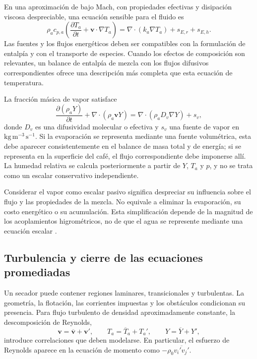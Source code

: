 En una aproximación de bajo Mach, con propiedades efectivas y disipación viscosa despreciable, una ecuación sensible para el fluido es
\begin{equation}
\rho_ac_{p,a}\left(
\frac{\partial T_a}{\partial t}+\mathbf v\cdot\nabla T_a\right)
=\nabla\cdot(k_a\nabla T_a)+s_{E,r}+s_{E,h}.
\label{eq:energia}
\end{equation}
Las fuentes y los flujos energéticos deben ser compatibles con la formulación de entalpía y con el transporte de especies. Cuando los efectos de composición son relevantes, un balance de entalpía de mezcla con los flujos difusivos correspondientes ofrece una descripción más completa que esta ecuación de temperatura.

La fracción másica de vapor satisface
\begin{equation}
\frac{\partial(\rho_aY)}{\partial t}
+\nabla\cdot(\rho_a\mathbf vY)
=\nabla\cdot(\rho_aD_v\nabla Y)+s_v,
\label{eq:species}
\end{equation}
donde $D_v$ es una difusividad molecular o efectiva y $s_v$ una fuente de vapor en $\mathrm{kg\,m^{-3}\,s^{-1}}$. Si la evaporación se representa mediante una fuente volumétrica, esta debe aparecer consistentemente en el balance de masa total y de energía; si se representa en la superficie del café, el flujo correspondiente debe imponerse allí. La humedad relativa se calcula posteriormente a partir de $Y$, $T_a$ y $p$, y no se trata como un escalar conservativo independiente.

Considerar el vapor como escalar pasivo significa despreciar su influencia sobre el flujo y las propiedades de la mezcla. No equivale a eliminar la evaporación, su costo energético o su acumulación. Esta simplificación depende de la magnitud de los acoplamientos higrométricos, no de que el agua se represente mediante una ecuación escalar \cite{versteeg2007}.

\subsection{Turbulencia y cierre de las ecuaciones promediadas}

Un secador puede contener regiones laminares, transicionales y turbulentas. La geometría, la flotación, las corrientes impuestas y los obstáculos condicionan su presencia. Para flujo turbulento de densidad aproximadamente constante, la descomposición de Reynolds,
\begin{equation}
\mathbf v=\overline{\mathbf v}+\mathbf v',
\qquad
T_a=\overline T_a+T_a',
\qquad
Y=\overline Y+Y',
\label{eq:descomposicion_reynolds}
\end{equation}
introduce correlaciones que deben modelarse. En particular, el esfuerzo de Reynolds aparece en la ecuación de momento como $-\rho_0\overline{v_i'v_j'}$.

